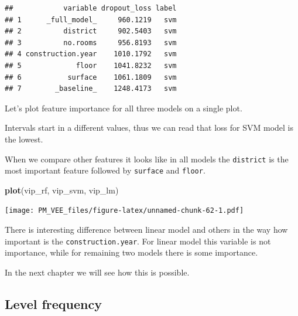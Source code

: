 \documentclass[12pt,]{krantz}
\newenvironment{Shaded}{\begin{snugshade}}{\end{snugshade}}
\newcommand{\DataTypeTok}[1]{\textcolor[rgb]{0.13,0.29,0.53}{#1}}
\newcommand{\DecValTok}[1]{\textcolor[rgb]{0.00,0.00,0.81}{#1}}
\newcommand{\KeywordTok}[1]{\textcolor[rgb]{0.13,0.29,0.53}{\textbf{#1}}}
\newcommand{\NormalTok}[1]{#1}
\newcommand{\OperatorTok}[1]{\textcolor[rgb]{0.81,0.36,0.00}{\textbf{#1}}}
\newcommand{\StringTok}[1]{\textcolor[rgb]{0.31,0.60,0.02}{#1}}
\theoremstyle{definition}
\theoremstyle{definition}
\theoremstyle{definition}
\theoremstyle{remark}
\begin{document}
\begin{Shaded}
\end{Shaded}

\begin{verbatim}
##            variable dropout_loss label
## 1      _full_model_     960.1219   svm
## 2          district     902.5403   svm
## 3          no.rooms     956.8193   svm
## 4 construction.year    1010.1792   svm
## 5             floor    1041.8232   svm
## 6           surface    1061.1809   svm
## 7        _baseline_    1248.4173   svm
\end{verbatim}

Let's plot feature importance for all three models on a single plot.

Intervals start in a different values, thus we can read that loss for
SVM model is the lowest.

When we compare other features it looks like in all models the
\texttt{district} is the most important feature followed by
\texttt{surface} and \texttt{floor}.

\begin{Shaded}
\begin{Highlighting}[]
\KeywordTok{plot}\NormalTok{(vip_rf, vip_svm, vip_lm)}
\end{Highlighting}
\end{Shaded}

\texttt{[image: PM\_VEE\_files/figure-latex/unnamed-chunk-62-1.pdf]}

There is interesting difference between linear model and others in the
way how important is the \texttt{construction.year}. For linear model
this variable is not importance, while for remaining two models there is
some importance.

In the next chapter we will see how this is possible.

\hypertarget{level-frequency}{%
\subsection{Level frequency}\label{level-frequency}}
\end{document}
